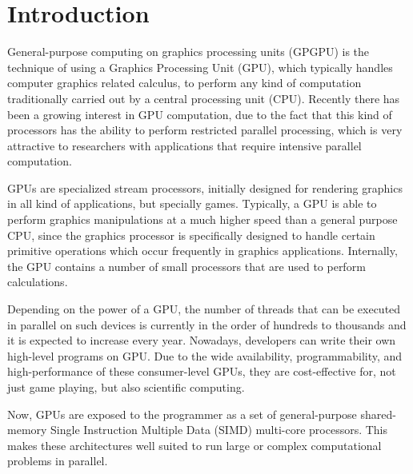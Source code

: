 \documentclass[Afour,sageh,times]{sagej}
\begin{document}

\maketitle







\section{Introduction}
\label{sec:intro}

General-purpose computing on graphics processing units (GPGPU) is the technique of using a Graphics Processing Unit (GPU), which typically handles computer graphics related calculus, to perform any kind of computation traditionally carried out by a central processing unit (CPU). Recently there has been a growing interest in GPU computation, due to the fact that this kind of processors has the ability to perform restricted parallel processing, which is very attractive to researchers with applications that require intensive parallel computation.

GPUs are specialized stream processors, initially designed for rendering graphics in all kind of applications, but specially games. Typically, a GPU is able to perform graphics manipulations at a much higher speed than a general purpose CPU, since the graphics processor is specifically designed to handle certain primitive operations which occur frequently in graphics applications. Internally, the GPU contains a number of small processors that are used to perform calculations. 

Depending on the power of a GPU, the number of threads that can be executed in parallel on such devices is currently in the order of
hundreds to thousands and it is expected to increase every year. Nowadays, developers can write their own high-level programs on GPU. Due to the wide availability, programmability, and high-performance of these consumer-level GPUs, they are cost-effective for, not just game playing, but also scientific computing.

Now, GPUs are exposed to the programmer as a set of general-purpose shared-memory Single Instruction Multiple Data (SIMD) multi-core processors. This makes these architectures well suited to run large or complex computational problems in parallel.
\end{document}
